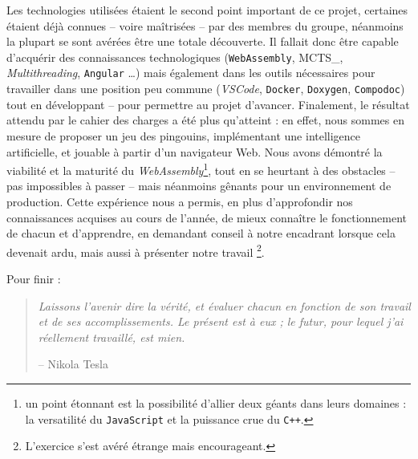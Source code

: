 \documentclass[a4paper,11pt]{article}
\begin{document}
Les technologies utilisées étaient le second point important de ce
projet, certaines étaient déjà connues -- voire maîtrisées -- par des
membres du groupe, néanmoins la plupart se sont avérées être une totale
découverte. Il fallait donc être capable d'acquérir des connaissances
technologiques (\texttt{WebAssembly}, MCTS\_, \emph{Multithreading},
\texttt{Angular} \ldots{}) mais également dans les outils nécessaires
pour travailler dans une position peu commune (\emph{VSCode},
\texttt{Docker}, \texttt{Doxygen}, \texttt{Compodoc}) tout en
développant -- pour permettre au projet d'avancer. Finalement, le
résultat attendu par le cahier des charges a été plus qu'atteint : en
effet, nous sommes en mesure de proposer un jeu des pingouins,
implémentant une intelligence artificielle, et jouable à partir d'un
navigateur Web. Nous avons démontré la viabilité et la maturité du
\emph{WebAssembly}\footnote{un point étonnant est la possibilité
  d'allier deux géants dans leurs domaines : la versatilité du
  \texttt{JavaScript} et la puissance crue du \texttt{C++}.}, tout en se
heurtant à des obstacles -- pas impossibles à passer -- mais néanmoins
gênants pour un environnement de production. Cette expérience nous a
permis, en plus d'approfondir nos connaissances acquises au cours de
l'année, de mieux connaître le fonctionnement de chacun et d'apprendre,
en demandant conseil à notre encadrant lorsque cela devenait ardu, mais
aussi à présenter notre travail \footnote{L'exercice s'est avéré étrange
  mais encourageant.}.

Pour finir :

\begin{quote}
\emph{Laissons l'avenir dire la vérité, et évaluer chacun en fonction de
son travail et de ses accomplissements. Le présent est à eux ; le futur,
pour lequel j'ai réellement travaillé, est mien.}

-- Nikola Tesla
\end{quote}

% 

\end{document}
